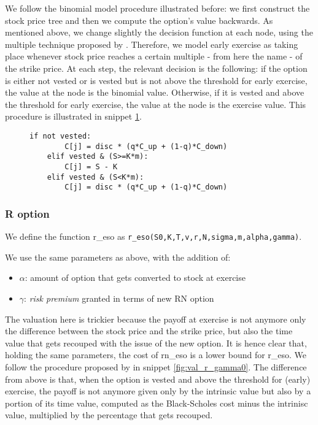     
We follow the binomial model procedure illustrated before: we first construct the stock price tree and then we compute the option's value backwards. As mentioned above, we change slightly the decision function at each node, using the multiple technique proposed by \cite{hull2002determining}. Therefore, we model early exercise as taking
place whenever stock price reaches a certain multiple - from here the name - of the strike price.
At each step, the relevant decision is the following: if the option is either not vested or is vested but is not above the threshold for early exercise, the value at the node is the binomial value. Otherwise, if it is vested and above the threshold for early exercise, the value at the node is the exercise value. This procedure is illustrated in snippet \ref*{fig:val_rn}.

\begin{figure}[H]
    \begin{lstlisting}[breaklines, basicstyle=\ttfamily\small]
    if not vested: 
        C[j] = disc * (q*C_up + (1-q)*C_down)
    elif vested & (S>=K*m):            
        C[j] = S - K
    elif vested & (S<K*m):
        C[j] = disc * (q*C_up + (1-q)*C_down)
    \end{lstlisting}
 \label{fig:val_rn}
\end{figure}

\subsubsection*{R option}
We define the function r\_eso as \verb|r_eso(S0,K,T,v,r,N,sigma,m,alpha,gamma)|.
    


We use the same parameters as above, with the addition of:
\begin{itemize}
    \item $\alpha$: amount of option that gets converted to stock at exercise
    \item $\gamma$: \textit{risk premium} granted in terms of new RN option 
\end{itemize}

The valuation here is trickier because the payoff at exercise is not anymore only the difference between the stock price and the strike price, but also the time value that gets recouped with the issue of the new option. It is hence clear that, holding the same parameters, the cost of rn\_eso is a lower bound for r\_eso. We follow the procedure proposed by \cite{huang2013dynamic} in snippet \ref*{fig:val_r_gamma0}. The difference from above is that, when the option is vested and above the threshold for (early) exercise, the payoff is not anymore given only by the intrinsic value but also by a portion of its time value, computed as the Black-Scholes cost minus the intrinisc value, multiplied by the percentage that gets recouped. 

